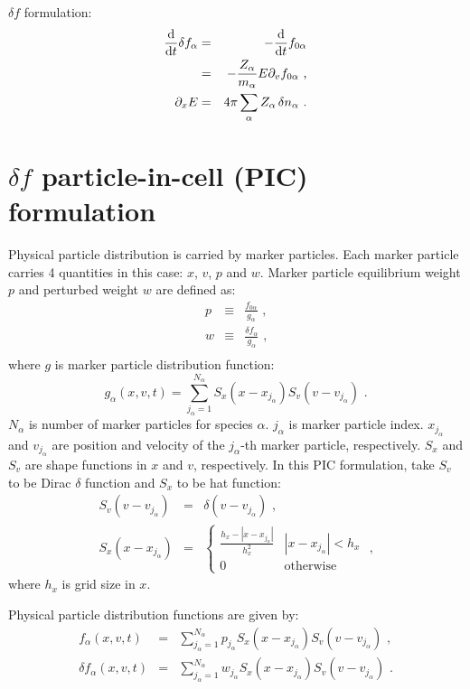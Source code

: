 \documentclass[12pt]{article}
\begin{document}
$\delta f$ formulation:
\begin{eqnarray}
	\frac{\mathrm{d}}{\mathrm{d} t} \delta f_{\alpha} & = & - \frac{\mathrm{d}}{\mathrm{d} t} f_{0 \alpha} \nonumber \\
	& = & - \frac{Z_\alpha}{m_\alpha} E \partial_v f_{0 \alpha} \textrm{ ,} \\
	\partial_x E & = & 4 \pi \sum_\alpha Z_\alpha \,\delta n_\alpha \textrm{ .}
\end{eqnarray}


\section{$\delta f$ particle-in-cell (PIC) formulation}
\label{sec:df_pic}

Physical particle distribution is carried by marker particles.
Each marker particle carries 4 quantities in this case: $x$, $v$, $p$ and $w$.
Marker particle equilibrium weight $p$ and perturbed weight $w$ are defined as:
\begin{eqnarray}
	p & \equiv & \frac{f_{0 \alpha}}{g_\alpha} \textrm{ ,} \\
	w & \equiv & \frac{\delta f_\alpha}{g_\alpha} \textrm{ ,} \\
\end{eqnarray}
where $g$ is marker particle distribution function:
\begin{equation}
	g_\alpha(x, v, t) = \sum_{j_\alpha = 1}^{N_\alpha} S_x(x - x_{j_\alpha}) S_v(v - v_{j_\alpha}) \textrm{ .}
\end{equation}
$N_\alpha$ is number of marker particles for species $\alpha$.
$j_\alpha$ is marker particle index.
$x_{j_\alpha}$ and $v_{j_\alpha}$ are position and velocity of the $j_{\alpha}$-th marker particle, respectively.
$S_x$ and $S_v$ are shape functions in $x$ and $v$, respectively.
In this PIC formulation, take $S_v$ to be Dirac $\delta$ function and $S_x$ to be hat function:
\begin{eqnarray}
	S_v(v - v_{j_\alpha}) & = & \delta(v - v_{j_\alpha}) \textrm{ ,} \\
	S_x(x - x_{j_\alpha}) & = & \left\{ \begin{array}{ll}
		\frac{h_x - |x - x_{j_\alpha}|}{h_x^2} & |x - x_{j_\alpha}| < h_x \\
		0 & \textrm{otherwise}
	\end{array} \right. \textrm{ ,}
\end{eqnarray}
where $h_x$ is grid size in $x$.

Physical particle distribution functions are given by:
\begin{eqnarray}
	f_\alpha(x, v, t) & = & \sum_{j_\alpha = 1}^{N_\alpha} p_{j_\alpha} S_x(x - x_{j_\alpha}) S_v(v - v_{j_\alpha}) \textrm{ ,} \\
	\delta f_\alpha(x, v, t) & = & \sum_{j_\alpha = 1}^{N_\alpha} w_{j_\alpha} S_x(x - x_{j_\alpha}) S_v(v - v_{j_\alpha}) \textrm{ .}
\end{eqnarray}
\end{document}
